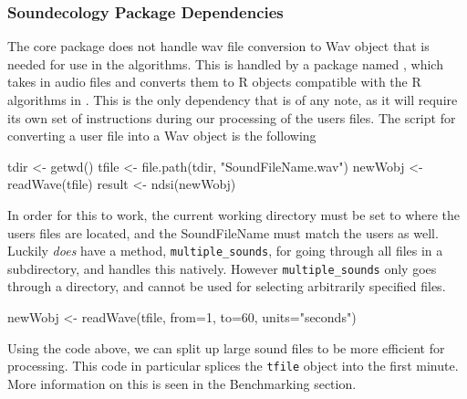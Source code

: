 \subsubsection{Soundecology Package Dependencies}
The core  package does not handle wav file conversion to Wav object that is needed for use in the algorithms. This is handled by a package named , which takes in audio files and converts them to R objects compatible with the R algorithms in . This is the only dependency that is of any note, as it will require its own set of instructions during our processing of the user\textquotesingle s files. The script for converting a user file into a Wav object is the following

\begin{javascriptcode}
tdir <- getwd()
tfile <- file.path(tdir, "SoundFileName.wav")
newWobj <- readWave(tfile)
result <- ndsi(newWobj)
\end{javascriptcode}

In order for this to work, the current working directory must be set to where the user\textquotesingle s files are located, and the SoundFileName must match the user\textquotesingle s as well. Luckily  \textit{does} have a method, \verb|multiple_sounds|, for going through all files in a subdirectory, and handles this natively. However \verb|multiple_sounds| only goes through a directory, and cannot be used for selecting arbitrarily specified files.\\

\begin{javascriptcode}
newWobj <- readWave(tfile, from=1, to=60, units="seconds")
\end{javascriptcode}

Using the code above, we can split up large sound files to be more efficient for processing. This code in particular splices the \verb|tfile| object into the first minute. More information on this is seen in the Benchmarking section.
